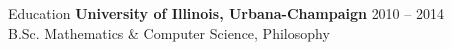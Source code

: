 \documentclass{resume} %
\begin{document}

\begin{rSection}{Education}
{\bf University of Illinois, Urbana-Champaign} \hfill {\textsc{2010 -- 2014}} \\
B.Sc. Mathematics \& Computer Science, Philosophy
\end{rSection}






\end{document}
